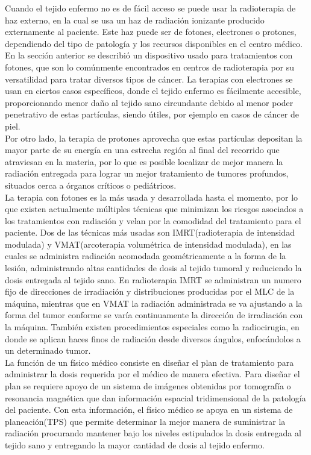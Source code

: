Cuando el tejido enfermo no es de fácil acceso se puede usar la radioterapia de haz externo, en la cual se usa un haz de radiación ionizante producido externamente al paciente. Este haz puede ser de fotones, electrones o protones, dependiendo del tipo de patología y los recursos disponibles en el centro médico. En la sección anterior se describió un dispositivo usado para tratamientos con fotones, que son lo comúnmente encontrados en centros de radioterapia por su versatilidad para tratar diversos tipos de cáncer. La terapias con electrones se usan en ciertos casos específicos, donde el tejido enfermo es fácilmente accesible, proporcionando menor daño al tejido sano circundante debido al menor poder penetrativo de estas partículas, siendo útiles, por ejemplo en casos de cáncer de piel. \\

Por otro lado, la terapia de protones aprovecha que estas partículas depositan la mayor parte de su energía en una estrecha región al final del recorrido que atraviesan en la materia, por lo que es posible localizar de mejor manera la radiación entregada para lograr un mejor tratamiento de tumores profundos, situados cerca a órganos críticos o pediátricos\cite{hadronterapia}.\\

La terapia con fotones es la más usada y desarrollada hasta el momento, por lo que existen actualmente múltiples técnicas que minimizan los riesgos asociados a los tratamientos con radiación y velan por la comodidad del tratamiento para el paciente. Dos de las técnicas más usadas son IMRT(radioterapia de intensidad modulada) y VMAT(arcoterapia volumétrica de intensidad modulada), en las cuales se administra radiación acomodada geométricamente a la forma de la lesión, administrando altas cantidades de dosis al tejido tumoral y reduciendo la dosis entregada al tejido sano. En radioterapia IMRT se administran un numero fijo de direcciones de irradiación y distribuciones producidas por el MLC de la máquina, mientras que en VMAT la radiación administrada se va ajustando a la forma del tumor conforme se varía continuamente la dirección de irradiación con la máquina. También existen procedimientos especiales como la radiocirugia, en donde se aplican haces finos de radiación desde diversos ángulos, enfocándolos a un determinado tumor.\\



La función de un físico médico consiste en diseñar el plan de tratamiento para administrar la dosis requerida por el médico de manera efectiva. Para diseñar el plan se requiere apoyo de un sistema de imágenes obtenidas por tomografía o resonancia magnética que dan información espacial tridimensional de la patología del paciente. Con esta información, el físico médico se apoya en un sistema de planeación(TPS) que permite determinar la mejor manera de suministrar la radiación procurando mantener bajo los niveles estipulados la dosis entregada al tejido sano y entregando la mayor cantidad de dosis al tejido enfermo.\\

